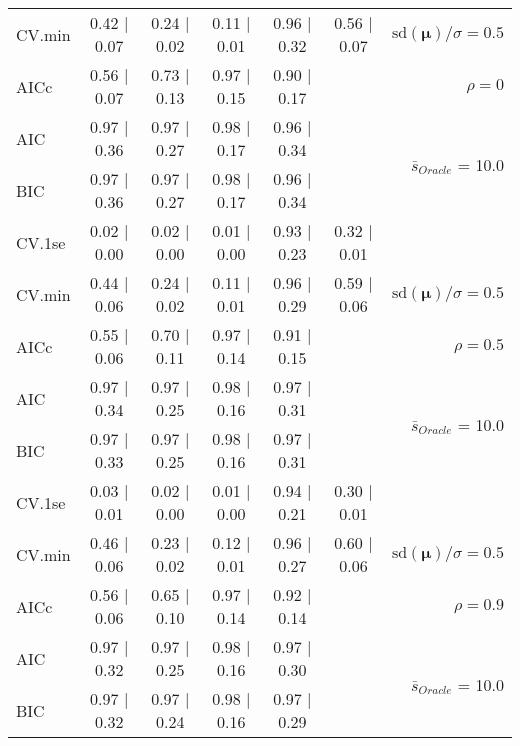 \begin{table}
\begin{center}
\begin{tabular}{l*{5}{c}|r}
CV.min & 0.42 $\mid$ 0.07 & 0.24 $\mid$ 0.02 & 0.11 $\mid$ 0.01 & 0.96 $\mid$ 0.32 & 0.56 $\mid$ 0.07 &  $\mathrm{sd}(\mathbf{\mu})/\sigma=0.5$ \\
AICc & 0.56 $\mid$ 0.07 & 0.73 $\mid$ 0.13 & 0.97 $\mid$ 0.15 & 0.90 $\mid$ 0.17 & & $\rho=0$ \\
AIC & 0.97 $\mid$ 0.36 & 0.97 $\mid$ 0.27 & 0.98 $\mid$ 0.17 & 0.96 $\mid$ 0.34 & &  \multirow{2}{*}{$\bar{s}_{Oracle}$ = 10.0} \\
BIC & 0.97 $\mid$ 0.36 & 0.97 $\mid$ 0.27 & 0.98 $\mid$ 0.17 & 0.96 $\mid$ 0.34 & &  \\
 \hline 
CV.1se & 0.02 $\mid$ 0.00 & 0.02 $\mid$ 0.00 & 0.01 $\mid$ 0.00 & 0.93 $\mid$ 0.23 & 0.32 $\mid$ 0.01 & \\
CV.min & 0.44 $\mid$ 0.06 & 0.24 $\mid$ 0.02 & 0.11 $\mid$ 0.01 & 0.96 $\mid$ 0.29 & 0.59 $\mid$ 0.06 &  $\mathrm{sd}(\mathbf{\mu})/\sigma=0.5$ \\
AICc & 0.55 $\mid$ 0.06 & 0.70 $\mid$ 0.11 & 0.97 $\mid$ 0.14 & 0.91 $\mid$ 0.15 & & $\rho=0.5$ \\
AIC & 0.97 $\mid$ 0.34 & 0.97 $\mid$ 0.25 & 0.98 $\mid$ 0.16 & 0.97 $\mid$ 0.31 & &  \multirow{2}{*}{$\bar{s}_{Oracle}$ = 10.0} \\
BIC & 0.97 $\mid$ 0.33 & 0.97 $\mid$ 0.25 & 0.98 $\mid$ 0.16 & 0.97 $\mid$ 0.31 & &  \\
 \hline 
CV.1se & 0.03 $\mid$ 0.01 & 0.02 $\mid$ 0.00 & 0.01 $\mid$ 0.00 & 0.94 $\mid$ 0.21 & 0.30 $\mid$ 0.01 & \\
CV.min & 0.46 $\mid$ 0.06 & 0.23 $\mid$ 0.02 & 0.12 $\mid$ 0.01 & 0.96 $\mid$ 0.27 & 0.60 $\mid$ 0.06 &  $\mathrm{sd}(\mathbf{\mu})/\sigma=0.5$ \\
AICc & 0.56 $\mid$ 0.06 & 0.65 $\mid$ 0.10 & 0.97 $\mid$ 0.14 & 0.92 $\mid$ 0.14 & & $\rho=0.9$ \\
AIC & 0.97 $\mid$ 0.32 & 0.97 $\mid$ 0.25 & 0.98 $\mid$ 0.16 & 0.97 $\mid$ 0.30 & &  \multirow{2}{*}{$\bar{s}_{Oracle}$ = 10.0} \\
BIC & 0.97 $\mid$ 0.32 & 0.97 $\mid$ 0.24 & 0.98 $\mid$ 0.16 & 0.97 $\mid$ 0.29 & &  \\
 \hline 
\end{tabular}
\end{center}
\vspace{-1cm}
\end{table}




